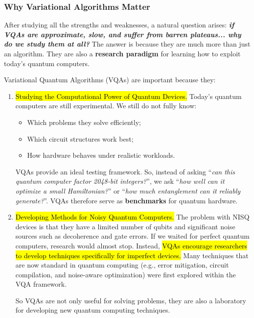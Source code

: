 \subsubsection{Why Variational Algorithms Matter}\label{sec:why-variational-algorithms-matter}

After studying all the strengths and weaknesses, a natural question arises: \emph{\textbf{if VQAs are approximate, slow, and suffer from barren plateaus... why do we study them at all?}} The answer is because they are much more than just an algorithm. They are also a \textbf{research paradigm} for learning how to exploit today's quantum computers.

\highspace
Variational Quantum Algorithms (VQAs) are important because they:
\begin{enumerate}
    \item \hl{Studying the Computational Power of Quantum Devices.} Today's quantum computers are still experimental. We still do not fully know:
    \begin{itemize}
        \item Which problems they solve efficiently;
        \item Which circuit structures work best;
        \item How hardware behaves under realistic workloads.
    \end{itemize}
    VQAs provide an ideal testing framework. So, instead of asking ``\emph{can this quantum computer factor 2048-bit integers?}'', we ask ``\emph{how well can it optimize a small Hamiltonian?}'' or ``\emph{how much entanglement can it reliably generate?}''. VQAs therefore serve as \textbf{benchmarks} for quantum hardware.
    
    
    \item \hl{Developing Methods for Noisy Quantum Computers.} The problem with NISQ devices is that they have a limited number of qubits and significant noise sources such as decoherence and gate errors. If we waited for perfect quantum computers, research would almost stop. Instead, \hl{VQAs encourage researchers to develop techniques specifically for imperfect devices.} Many techniques that are now standard in quantum computing (e.g., error mitigation, circuit compilation, and noise-aware optimization) were first explored within the VQA framework.
    
    So VQAs are not only useful for solving problems, they are also a laboratory for developing new quantum computing techniques.
    

\end{enumerate}
